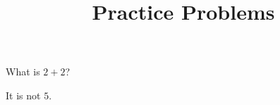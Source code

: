 \documentclass{homework}
\title{Practice Problems}
\begin{document}
 \maketitle

\question What is $2+2$?

It is not $5$.


\end{document}
